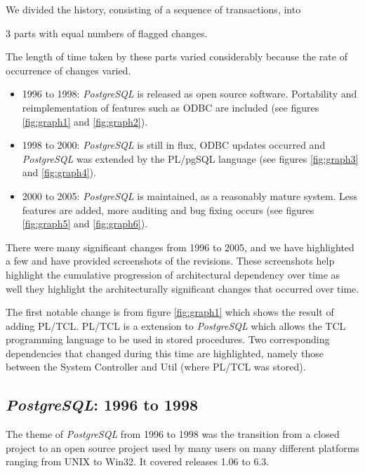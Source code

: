 \documentclass[times, 10pt,twocolumn]{article}
\newcommand{\postgresql}{\emph{PostgreSQL}\xspace}
\newcommand{\Subsection}[1]{\subsection{#1}}
\begin{document}

We divided the history, consisting of a sequence of transactions, into


3 parts with equal numbers of
flagged changes.  

The length of time taken by these parts varied considerably
because the rate of occurrence of changes varied.


\begin{itemize}
\item 1996 to 1998: \postgresql is released as open source software.
    Portability and reimplementation of features such as ODBC are included
    (see figures \ref{fig:graph1} and \ref{fig:graph2}).


\item 1998 to 2000: \postgresql is still in flux, ODBC updates occurred and
    \postgresql was extended by the PL/pgSQL language (see figures
    \ref{fig:graph3} and \ref{fig:graph4}).  
    
\item 2000 to 2005:
    \postgresql is  maintained,
        as a reasonably mature system.
    Less features are added, more
    auditing and bug fixing occurs (see figures \ref{fig:graph5} and
    \ref{fig:graph6}).
\end{itemize}

There were many significant changes from 1996 to 2005, and we have
highlighted a few and have provided screenshots of the revisions.  These
screenshots help highlight the cumulative progression of architectural
dependency over time as well they highlight the architecturally significant
changes that occurred over time.

The first notable change is from figure \ref{fig:graph1} which shows the
result of adding PL/TCL. PL/TCL is a extension to \postgresql which allows
the TCL programming language to be used in stored procedures.  Two corresponding
dependencies that changed during this time
are highlighted, namely those between the
System Controller and Util (where PL/TCL was stored).

\Subsection{\postgresql: 1996 to 1998}

The theme of \postgresql from 1996 to 1998 was the transition from a closed
project to an open source project used by many users on many different
platforms ranging from UNIX to Win32. It covered releases 1.06 to 6.3.
\end{document}

